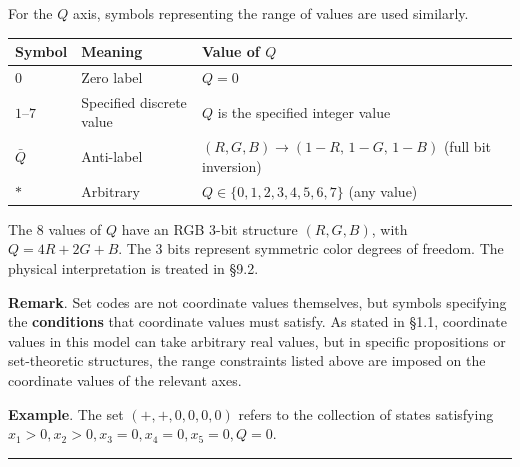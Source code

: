 \documentclass[
  a4paper,11pt]{article}
\newcounter{none}
\theoremstyle{definition}
\theoremstyle{remark}
\begin{document}
For the \(Q\) axis, symbols representing the range of values are used
similarly.

{\def\LTcaptype{none} %
\begin{longtable}[]{@{}
  >{\centering\arraybackslash}p{}
  >{\raggedright\arraybackslash}p{}
  >{\raggedright\arraybackslash}p{}@{}}
\toprule\noalign{}
\begin{minipage}[b]{\linewidth}\centering
Symbol
\end{minipage} & \begin{minipage}[b]{\linewidth}\raggedright
Meaning
\end{minipage} & \begin{minipage}[b]{\linewidth}\raggedright
Value of \(Q\)
\end{minipage} \\
\midrule\noalign{}
\endhead
\bottomrule\noalign{}
\endlastfoot
\(0\) & Zero label & \(Q = 0\) \\
\(1\)--\(7\) & Specified discrete value & \(Q\) is the specified integer
value \\
\(\bar{Q}\) & Anti-label & \((R, G, B) \to (1{-}R,\, 1{-}G,\, 1{-}B)\)
(full bit inversion) \\
\(*\) & Arbitrary & \(Q \in \{0, 1, 2, 3, 4, 5, 6, 7\}\) (any value) \\
\end{longtable}
}

The 8 values of \(Q\) have an RGB 3-bit structure \((R, G, B)\), with
\(Q = 4R + 2G + B\). The 3 bits represent symmetric color degrees of
freedom. The physical interpretation is treated in §9.2.

\textbf{Remark}. Set codes are not coordinate values themselves, but
symbols specifying the \textbf{conditions} that coordinate values must
satisfy. As stated in §1.1, coordinate values in this model can take
arbitrary real values, but in specific propositions or set-theoretic
structures, the range constraints listed above are imposed on the
coordinate values of the relevant axes.

\textbf{Example}. The set \((+, +, 0, 0, 0, 0)\) refers to the
collection of states satisfying
\(x_1 > 0, x_2 > 0, x_3 = 0, x_4 = 0, x_5 = 0, Q = 0\).

\begin{center}\rule{0.5\linewidth}{0.5pt}\end{center}
\end{document}
